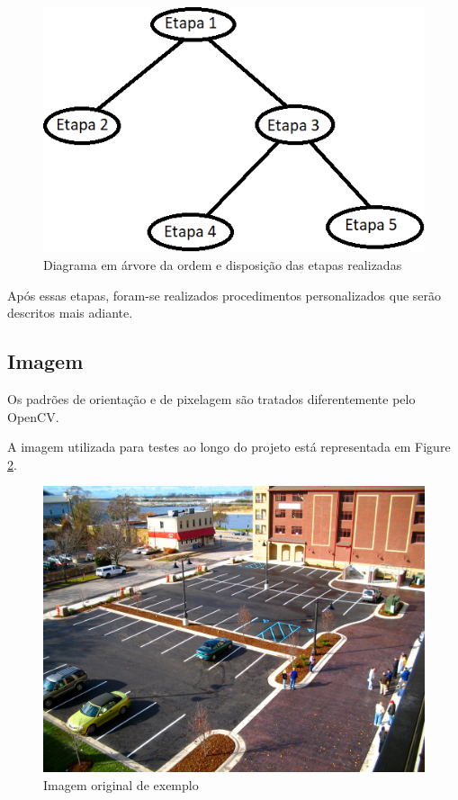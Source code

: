 \documentclass[10pt,twocolumn,letterpaper]{article}
\begin{document}
\begin{figure}[!htb]
\centering
\includegraphics[scale=0.6]{introducao.png}
\caption{Diagrama em árvore da ordem e disposição das etapas realizadas}
\label{fig:intro}
\end{figure}

	Após essas etapas, foram-se realizados procedimentos personalizados que serão descritos mais adiante.

\subsection{Imagem}

	Os padrões de orientação e de pixelagem são tratados diferentemente pelo OpenCV.

	A imagem utilizada para testes ao longo do projeto está representada em Figure \ref{fig:original}.

\begin{figure}[!htb]
\centering
\includegraphics[scale=0.15]{estacionamento.jpg}
\caption{Imagem original de exemplo}
\label{fig:original}
\end{figure}
\end{document}

